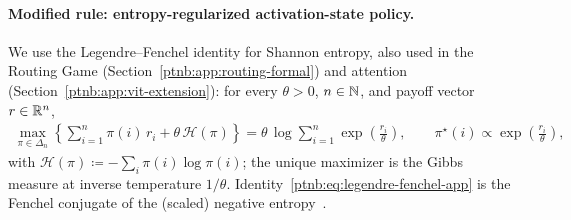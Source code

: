 \paragraph{Modified rule: entropy-regularized activation-state policy.}\label{ptnb:app:softplus-rules}
We use the Legendre--Fenchel identity for Shannon entropy, also used in the Routing Game
(Section~\ref{ptnb:app:routing-formal}) and attention (Section~\ref{ptnb:app:vit-extension}): for every $\theta>0$, $n\in\mathbb{N}$, and
payoff vector $r \in \mathbb{R}^n$,
\begin{align}\label{ptnb:eq:legendre-fenchel-app}
    \max_{\pi \in \Delta_n} \left\{ \sum_{i=1}^n \pi(i)\, r_i + \theta\, \mathcal{H}(\pi) \right\}
    = \theta\, \log \sum_{i=1}^n \exp\!\left(\frac{r_i}{\theta}\right),
    \qquad \pi^\star(i) \propto \exp\!\left(\frac{r_i}{\theta}\right),
\end{align}
with $\mathcal{H}(\pi) \coloneqq -\sum_i \pi(i)\log \pi(i)$; the unique maximizer is the Gibbs
measure at inverse temperature $1/\theta$. Identity~\eqref{ptnb:eq:legendre-fenchel-app} is the Fenchel
conjugate of the (scaled) negative entropy~\parencite{BoydVandenberghe2004}.

